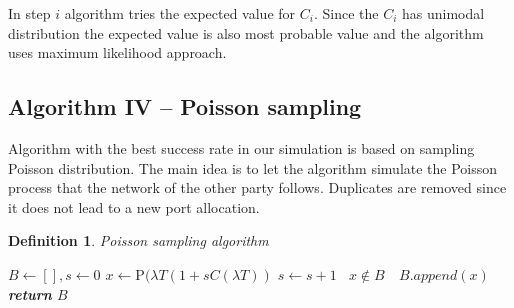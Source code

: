 \documentclass[twoside]{article}
\newtheorem{mydef}{Definition}
\begin{document}
\begin{multicols}{2}
In step $i$ algorithm tries the expected value for $C_i$. Since the $C_i$ has unimodal distribution
the expected value is also most probable value and the algorithm uses maximum likelihood approach.

\subsection{Algorithm IV -- Poisson sampling}
Algorithm with the best success rate in our simulation is based on sampling Poisson distribution.
The main idea is to let the algorithm simulate the Poisson process that the network of the
other party follows. Duplicates are removed since it does not lead to a new port allocation.

\begin{mydef}
Poisson sampling algorithm 


\begin{algorithmic}[1]
  \newcommand{\LineIf}[2]{ \State \algorithmicif\ {#1}\ \algorithmicthen\ {#2}}%
    \State $B\gets [], s \gets 0$
      \State $x\gets \text{P}(\lambda T (1+s C(\lambda T))$
      \State $s\gets s+1$
      \LineIf{$x \notin B$}{$B.append(x)$} %
    \EndWhile
    \State \textbf{return} $B$
   \EndFunction\\
    

\end{algorithmic}
\end{mydef}
\end{multicols}
\end{document}
